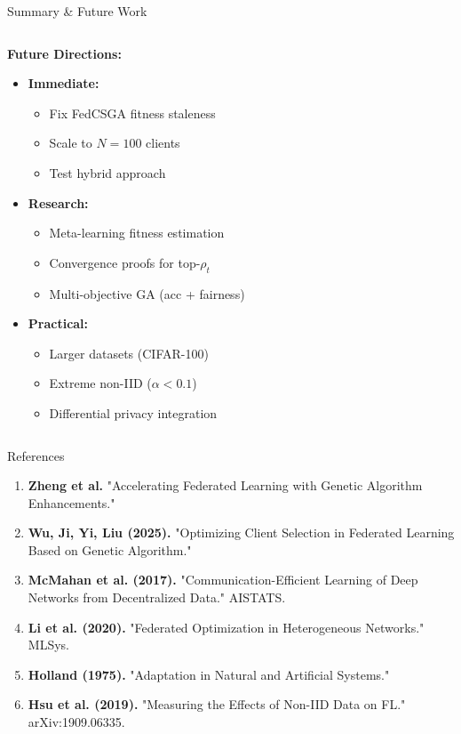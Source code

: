 \documentclass{beamer}
\begin{document}
\begin{frame}{Summary \& Future Work}
\begin{columns}[T]
\begin{column}{0.48\textwidth}
\textbf{Future Directions:}
\begin{itemize}
\item \textbf{Immediate:}
  \begin{itemize}
  \scriptsize
  \item Fix FedCSGA fitness staleness
  \item Scale to $N=100$ clients
  \item Test hybrid approach
  \end{itemize}
\item \textbf{Research:}
  \begin{itemize}
  \scriptsize
  \item Meta-learning fitness estimation
  \item Convergence proofs for top-$\rho_t$
  \item Multi-objective GA (acc + fairness)
  \end{itemize}
\item \textbf{Practical:}
  \begin{itemize}
  \scriptsize
  \item Larger datasets (CIFAR-100)
  \item Extreme non-IID ($\alpha < 0.1$)
  \item Differential privacy integration
  \end{itemize}
\end{itemize}
\end{column}
\end{columns}
\end{frame}

\begin{frame}{References}
\small
\begin{enumerate}
\item \textbf{Zheng et al.} "Accelerating Federated Learning with Genetic Algorithm Enhancements."
\item \textbf{Wu, Ji, Yi, Liu (2025).} "Optimizing Client Selection in Federated Learning Based on Genetic Algorithm."
\item \textbf{McMahan et al. (2017).} "Communication-Efficient Learning of Deep Networks from Decentralized Data." AISTATS.
\item \textbf{Li et al. (2020).} "Federated Optimization in Heterogeneous Networks." MLSys.
\item \textbf{Holland (1975).} "Adaptation in Natural and Artificial Systems."
\item \textbf{Hsu et al. (2019).} "Measuring the Effects of Non-IID Data on FL." arXiv:1909.06335.
\end{enumerate}
\end{frame}
\end{document}
